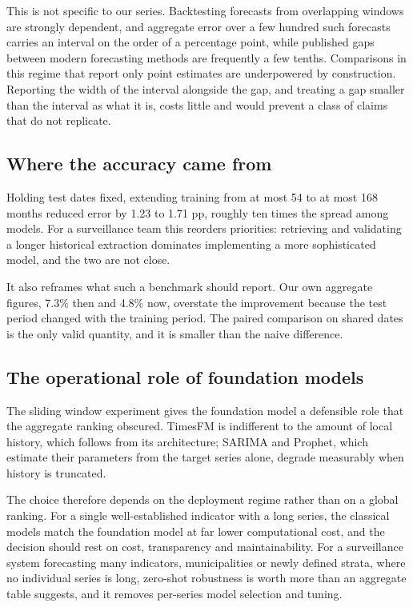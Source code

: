 This is not specific to our series. Backtesting forecasts from overlapping windows are
strongly dependent, and aggregate error over a few hundred such forecasts carries an
interval on the order of a percentage point, while published gaps between modern
forecasting methods are frequently a few tenths. Comparisons in this regime that report
only point estimates are underpowered by construction. Reporting the width of the interval
alongside the gap, and treating a gap smaller than the interval as what it is, costs little
and would prevent a class of claims that do not replicate.

\subsection{Where the accuracy came from}

Holding test dates fixed, extending training from at most 54 to at most 168 months reduced
error by 1.23 to 1.71 pp, roughly ten times the spread among models. For a surveillance
team this reorders priorities: retrieving and validating a longer historical extraction
dominates implementing a more sophisticated model, and the two are not close.

It also reframes what such a benchmark should report. Our own aggregate figures, 7.3\% then
and 4.8\% now, overstate the improvement because the test period changed with the training
period. The paired comparison on shared dates is the only valid quantity, and it is smaller
than the naive difference.

\subsection{The operational role of foundation models}

The sliding window experiment gives the foundation model a defensible role that the
aggregate ranking obscured. TimesFM is indifferent to the amount of local history, which
follows from its architecture; SARIMA and Prophet, which estimate their parameters from the
target series alone, degrade measurably when history is truncated.

The choice therefore depends on the deployment regime rather than on a global ranking. For a
single well-established indicator with a long series, the classical models match the
foundation model at far lower computational cost, and the decision should rest on cost,
transparency and maintainability. For a surveillance system forecasting many indicators,
municipalities or newly defined strata, where no individual series is long, zero-shot
robustness is worth more than an aggregate table suggests, and it removes per-series model
selection and tuning.


